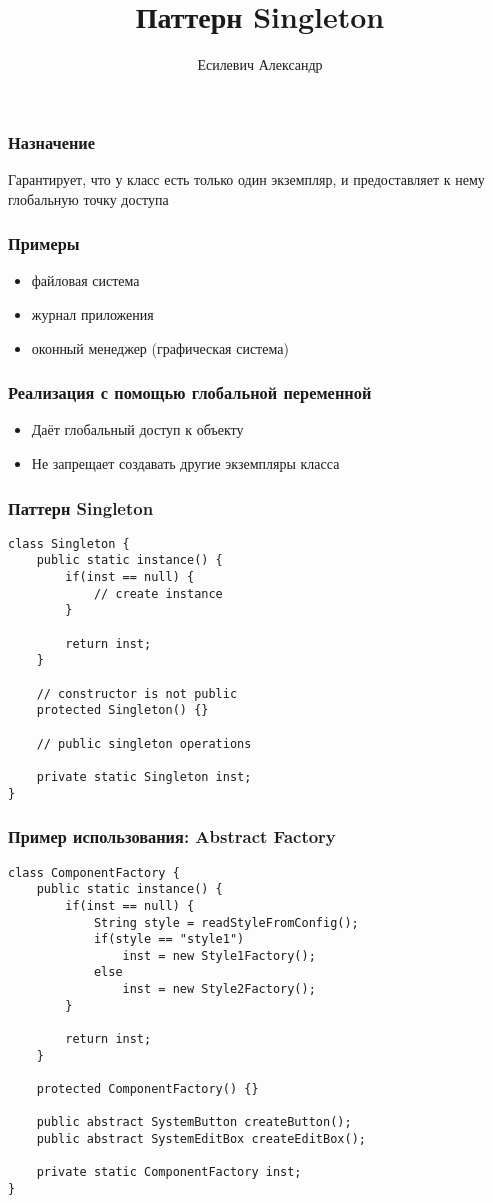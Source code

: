 \documentclass[handout]{beamer}
\title{Паттерн Singleton}
\author{Есилевич Александр}
\begin{document}
\maketitle

\begin{frame}[fragile]
\frametitle{Назначение}
Гарантирует, что у класс есть только один экземпляр, и предоставляет к нему
глобальную точку доступа
\end{frame}


\begin{frame}[fragile]
\frametitle{Примеры}
\begin{itemize}
\item файловая система
\item журнал приложения
\item оконный менеджер (графическая система)
\end{itemize}
\end{frame}


\begin{frame}[fragile]
\frametitle{Реализация с помощью глобальной переменной}
\begin{itemize}
\item Даёт глобальный доступ к объекту
\item Не запрещает создавать другие экземпляры класса
\end{itemize}
\end{frame}


\begin{frame}[fragile]
\frametitle{Паттерн Singleton}
\begin{lstlisting}
class Singleton {
    public static instance() {
        if(inst == null) {
            // create instance
        }
        
        return inst;
    }
    
    // constructor is not public
    protected Singleton() {}
    
    // public singleton operations
    
    private static Singleton inst;
}
\end{lstlisting}
\end{frame}


\begin{frame}[fragile]
\frametitle{Пример использования: Abstract Factory}
\begin{lstlisting}
class ComponentFactory {
    public static instance() {
        if(inst == null) {
            String style = readStyleFromConfig();
            if(style == "style1")
                inst = new Style1Factory();
            else
                inst = new Style2Factory();
        }
        
        return inst;
    }
    
    protected ComponentFactory() {}
    
    public abstract SystemButton createButton();
    public abstract SystemEditBox createEditBox();
    
    private static ComponentFactory inst;
}
\end{lstlisting}
\end{frame}
\end{document}

